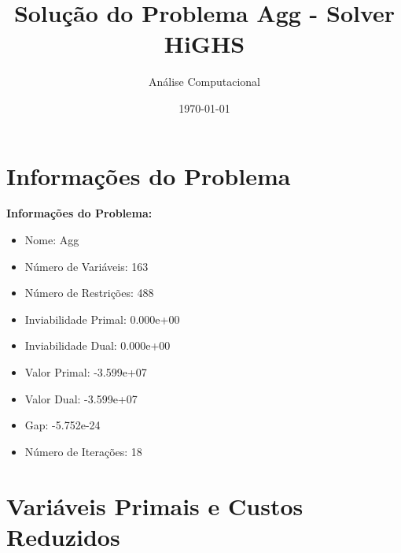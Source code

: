 \documentclass[12pt]{article}
\title{Solução do Problema Agg - Solver HiGHS}
\author{Análise Computacional}
\date{\today}
\begin{document}
\maketitle

\section{Informações do Problema}

\textbf{Informações do Problema:}
\begin{itemize}
\item Nome: Agg
\item Número de Variáveis: 163
\item Número de Restrições: 488
\item Inviabilidade Primal: 0.000e+00
\item Inviabilidade Dual: 0.000e+00
\item Valor Primal: -3.599e+07
\item Valor Dual: -3.599e+07
\item Gap: -5.752e-24
\item Número de Iterações: 18
\end{itemize}


\section{Variáveis Primais e Custos Reduzidos}
\end{document}
